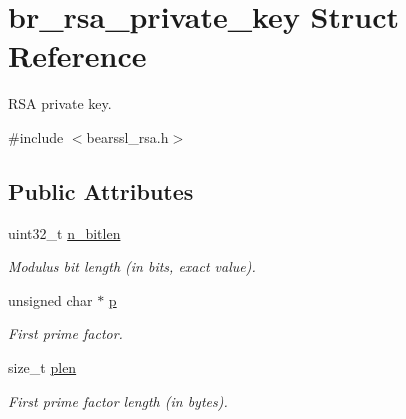 \hypertarget{structbr__rsa__private__key}{}\section{br\+\_\+rsa\+\_\+private\+\_\+key Struct Reference}
\label{structbr__rsa__private__key}


R\+SA private key.  




{\ttfamily \#include $<$bearssl\+\_\+rsa.\+h$>$}

\subsection*{Public Attributes}
\begin{DoxyCompactItemize}
\item 
\mbox{\label{structbr__rsa__private__key_a283fea483aeeab2fb03021ce54e1b5ce}} 
uint32\+\_\+t \hyperlink{structbr__rsa__private__key_a283fea483aeeab2fb03021ce54e1b5ce}{n\+\_\+bitlen}
\begin{DoxyCompactList}\small\item\em Modulus bit length (in bits, exact value). \end{DoxyCompactList}\item 
\mbox{\label{structbr__rsa__private__key_a591f80a155fc42e1d79e8169fad15d4a}} 
unsigned char $\ast$ \hyperlink{structbr__rsa__private__key_a591f80a155fc42e1d79e8169fad15d4a}{p}
\begin{DoxyCompactList}\small\item\em First prime factor. \end{DoxyCompactList}\item 
\mbox{\label{structbr__rsa__private__key_ab6fd51db3cd1ca46172091640c2258aa}} 
size\+\_\+t \hyperlink{structbr__rsa__private__key_ab6fd51db3cd1ca46172091640c2258aa}{plen}
\begin{DoxyCompactList}\small\item\em First prime factor length (in bytes). \end{DoxyCompactList}\item 
\mbox{\label{structbr__rsa__private__key_ac30acdf290d3dc4a686af6b03c245581}} 

\end{DoxyCompactItemize}
